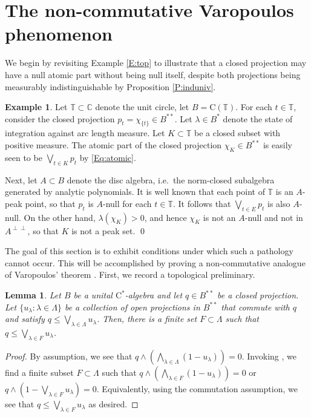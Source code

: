 \documentclass[10pt]{amsart}
\newcommand{\bC}{{\mathbb{C}}}
\newcommand{\bT}{{\mathbb{T}}}
\newcommand{\rC}{\mathrm{C}}
\newtheorem{lemma}{Lemma}[section]
\theoremstyle{definition}
\newtheorem{example}{Example}
\begin{document}
\section{The non-commutative Varopoulos phenomenon}\label{S:ncVar}

We begin by revisiting Example \ref{E:top} to illustrate that a closed projection may have a null atomic part without being null itself, despite both projections being measurably indistinguishable by Proposition \ref{P:induniv}.

\begin{example}\label{E:top2}
Let $\bT\subset\bC$ denote the unit circle, let $B=\rC(\bT)$. For each $t\in \bT$, consider the closed projection $p_t=\chi_{\{t\}}\in B^{**}$. Let $\lambda\in B^*$ denote the state of integration against arc length measure.   Let $K\subset \bT$ be a closed subset with positive measure. The atomic part of the closed  projection $\chi_K\in B^{**}$ is easily seen to be $\bigvee_{t\in K}p_t$ by \eqref{Eq:atomic}. 

Next, let $A\subset B$ denote the disc algebra, i.e.\ the norm-closed subalgebra generated by analytic polynomials.  It is well known that each point of $\bT$ is an $A$-peak point, so that $p_t$ is $A$-null for each $t\in \bT$. It follows that $\bigvee_{t\in E}p_t$ is also $A$-null. On the other hand, $\lambda(\chi_K)>0$, and hence $\chi_K$ is not an $A$-null \cite[Theorem 10.1.2]{rudin2008}
and not in $A^{\perp \perp}$, so that $K$ is not a peak set.  
\qed
\end{example}

The goal of this section is to exhibit conditions under which such a pathology cannot occur. This will be accomplished by proving a non-commutative analogue of Varopoulos' theorem \cite[Theorem 10.2.2]{rudin2008}. First, we record a topological preliminary.

\begin{lemma}\label{L:compact}
Let $B$ be a unital $\rC^*$-algebra and let $q\in B^{**}$ be a closed projection. Let $\{u_\lambda:\lambda\in \Lambda\}$ be a collection of open projections in $B^{**}$ that commute with $q$ and satisfy $q\leq \bigvee_{\lambda\in \Lambda}u_\lambda$. Then, there is a finite set $F\subset \Lambda$ such that $q\leq \bigvee_{\lambda\in F}u_\lambda$.
\end{lemma}
\begin{proof}
By assumption, we see that $q\wedge \left(\bigwedge_{\lambda\in \Lambda}(1-u_\lambda)\right)=0$. Invoking \cite[Proposition II.10]{akemann1969}, we find a finite subset $F\subset \Lambda$ such that $q\wedge \left( \bigwedge_{\lambda\in F}(1-u_\lambda)\right)=0$ or $q\wedge \left( 1-\bigvee_{\lambda\in F}u_\lambda\right)=0$. Equivalently, using the commutation assumption, we see that $q\leq \bigvee_{\lambda\in F}u_\lambda$ as desired.
\end{proof}
\end{document}

